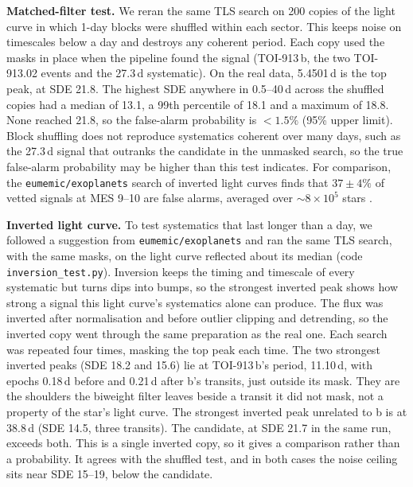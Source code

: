 \documentclass[11pt]{article}
\begin{document}
\textbf{Matched-filter test.} We reran the same TLS search on 200 copies of the light curve in which 1-day blocks were shuffled within each sector. This keeps noise on timescales below a day and destroys any coherent period. Each copy used the masks in place when the pipeline found the signal (TOI-913\,b, the two TOI-913.02 events and the 27.3\,d systematic). On the real data, 5.4501\,d is the top peak, at SDE 21.8. The highest SDE anywhere in 0.5--40\,d across the shuffled copies had a median of 13.1, a 99th percentile of 18.1 and a maximum of 18.8. None reached 21.8, so the false-alarm probability is $<1.5\%$ (95\% upper limit). Block shuffling does not reproduce systematics coherent over many days, such as the 27.3\,d signal that outranks the candidate in the unmasked search, so the true false-alarm probability may be higher than this test indicates. For comparison, the \texttt{eumemic/exoplanets} search of inverted light curves finds that $37\pm4\%$ of vetted signals at MES 9--10 are false alarms, averaged over $\sim8\times10^5$ stars \cite{eumemicissue}.

\textbf{Inverted light curve.} To test systematics that last longer than a day, we followed a suggestion from \texttt{eumemic/exoplanets} \cite{eumemicissue} and ran the same TLS search, with the same masks, on the light curve reflected about its median (code \texttt{inversion\_test.py}). Inversion keeps the timing and timescale of every systematic but turns dips into bumps, so the strongest inverted peak shows how strong a signal this light curve's systematics alone can produce. The flux was inverted after normalisation and before outlier clipping and detrending, so the inverted copy went through the same preparation as the real one. Each search was repeated four times, masking the top peak each time. The two strongest inverted peaks (SDE 18.2 and 15.6) lie at TOI-913\,b's period, 11.10\,d, with epochs 0.18\,d before and 0.21\,d after b's transits, just outside its mask. They are the shoulders the biweight filter leaves beside a transit it did not mask, not a property of the star's light curve. The strongest inverted peak unrelated to b is at 38.8\,d (SDE 14.5, three transits). The candidate, at SDE 21.7 in the same run, exceeds both. This is a single inverted copy, so it gives a comparison rather than a probability. It agrees with the shuffled test, and in both cases the noise ceiling sits near SDE 15--19, below the candidate.
\end{document}
